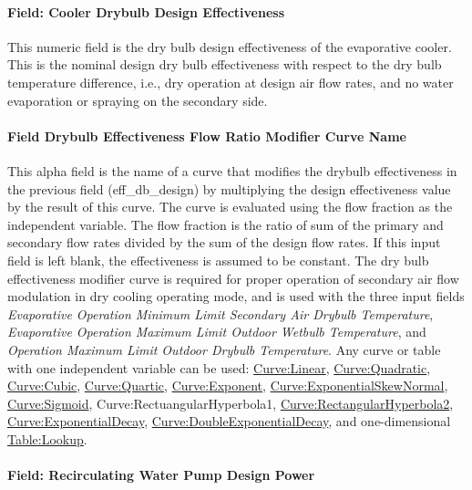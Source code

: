 \paragraph{Field: Cooler Drybulb Design Effectiveness}\label{field-cooler-drybulb-design-effectiveness}

This numeric field is the dry bulb design effectiveness of the evaporative cooler. This is the nominal design dry bulb effectiveness with respect to the dry bulb temperature difference, i.e., dry operation at design air flow rates, and no water evaporation or spraying on the secondary side.

\paragraph{Field Drybulb Effectiveness Flow Ratio Modifier Curve Name}\label{field-drybulb-effectiveness-flow-ratio-modifier-curve-name}

This alpha field is the name of a curve that modifies the drybulb effectiveness in the previous field (eff\_db\_design) by multiplying the design effectiveness value by the result of this curve. The curve is evaluated using the flow fraction as the independent variable. The flow fraction is the ratio of sum of the primary and secondary flow rates divided by the sum of the design flow rates. If this input field is left blank, the effectiveness is assumed to be constant. The dry bulb effectiveness modifier curve is required for proper operation of secondary air flow modulation in dry cooling operating mode, and is used with the three input fields \textit{Evaporative Operation Minimum Limit Secondary Air Drybulb Temperature}, \textit{Evaporative Operation Maximum Limit Outdoor Wetbulb Temperature}, and \textit{Operation Maximum Limit Outdoor Drybulb Temperature}. Any curve or table with one independent variable can be used: \hyperref[curvelinear]{Curve:Linear}, \hyperref[curvequadratic]{Curve:Quadratic}, \hyperref[curvecubic]{Curve:Cubic}, \hyperref[curvequartic]{Curve:Quartic}, \hyperref[curveexponent]{Curve:Exponent}, \hyperref[curveexponentialskewnormal]{Curve:ExponentialSkewNormal}, \hyperref[curvesigmoid]{Curve:Sigmoid}, Curve:RectuangularHyperbola1, \hyperref[curverectangularhyperbola2]{Curve:RectangularHyperbola2}, \hyperref[curveexponentialdecay]{Curve:ExponentialDecay}, \hyperref[curvedoubleexponentialdecay]{Curve:DoubleExponentialDecay}, and one-dimensional \hyperref[tablelookup]{Table:Lookup}.

\paragraph{Field: Recirculating Water Pump Design Power}\label{field-recirculating-water-pump-design-power}

